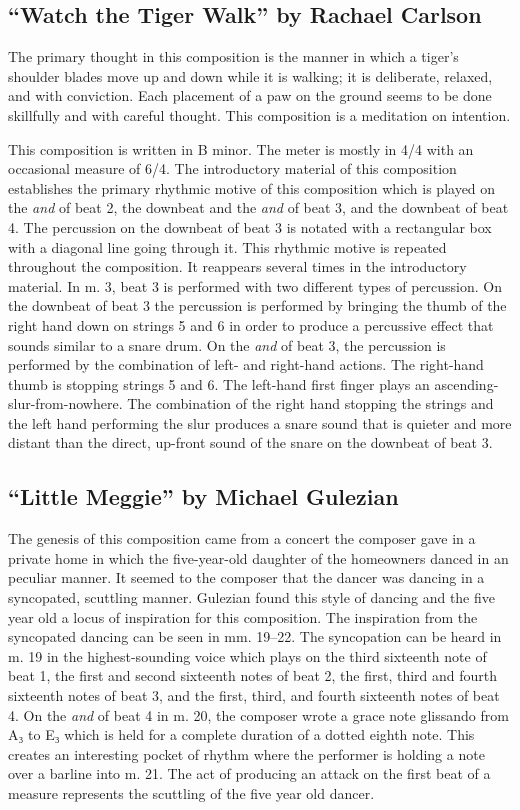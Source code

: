 \documentclass{tufte-handout}
\begin{document}
\subsection*{``Watch the Tiger Walk'' by Rachael Carlson}
\label{sec:watch-tiger-walk}
The primary thought in this composition is the manner in which a tiger's shoulder blades move up and down while it is walking; it is deliberate, relaxed, and with conviction. Each placement of a paw on the ground seems to be done skillfully and with careful thought. This composition is a meditation on intention.

This composition is written in B minor. The meter is mostly in 4/4 with an occasional measure of 6/4. The introductory material of this composition establishes the primary rhythmic motive of this composition which is played on the \emph{and} of beat 2, the downbeat and the \emph{and} of beat 3, and the downbeat of beat 4. The percussion on the downbeat of beat 3 is notated with a rectangular box with a diagonal line going through it. This rhythmic motive is repeated throughout the composition. It reappears several times in the introductory material. In m. 3, beat 3 is performed with two different types of percussion. On the downbeat of beat 3 the percussion is performed by bringing the thumb of the right hand down on strings 5 and 6 in order to produce a percussive effect that sounds similar to a snare drum. On the \emph{and} of beat 3, the percussion is performed by the combination of left- and right-hand actions. The right-hand thumb is stopping strings 5 and 6. The left-hand first finger plays an ascending-slur-from-nowhere. The combination of the right hand stopping the strings and the left hand performing the slur produces a snare sound that is quieter and more distant than the direct, up-front sound of the snare on the downbeat of beat 3.

\subsection*{``Little Meggie'' by Michael Gulezian}
\label{sec:little-megg-rach}
The genesis of this composition came from a concert the composer gave in a private home in which the five-year-old daughter of the homeowners danced in an peculiar manner. It seemed to the composer that the dancer was dancing in a syncopated, scuttling manner. Gulezian found this style of dancing and the five year old a locus of inspiration for this composition. The inspiration from the syncopated dancing can be seen in mm. 19–22. The syncopation can be heard in m. 19 in the highest-sounding voice which plays on the third sixteenth note of beat 1, the first and second sixteenth notes of beat 2, the first, third and fourth sixteenth notes of beat 3, and the first, third, and fourth sixteenth notes of beat 4. On the \emph{and} of beat 4 in m. 20, the composer wrote a grace note glissando from A₃ to E₃ which is held for a complete duration of a dotted eighth note. This creates an interesting pocket of rhythm where the performer is holding a note over a barline into m. 21. The act of producing an attack on the first beat of a measure represents the scuttling of the five year old dancer.
\end{document}

